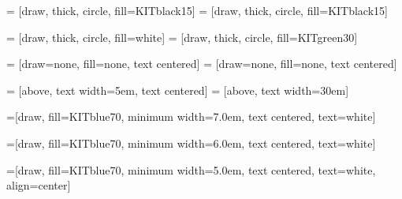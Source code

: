









 = [draw, thick, circle, fill=KITblack15]
 = [draw, thick, circle, fill=KITblack15]

 = [draw, thick, circle, fill=white]
 = [draw, thick, circle, fill=KITgreen30]

 = [draw=none, fill=none, text centered]
 = [draw=none, fill=none, text centered]

 = [above, text width=5em, text centered]
 = [above, text width=30em]

=[draw, fill=KITblue70, minimum width=7.0em, text centered, 
	text=white]

=[draw, fill=KITblue70, minimum width=6.0em, text centered, 
	text=white]

=[draw, fill=KITblue70, minimum width=5.0em, text centered, 
	text=white, align=center]

